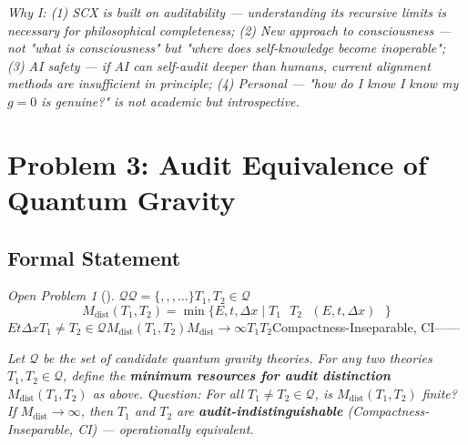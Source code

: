 \documentclass[12pt,a4paper]{article}
\theoremstyle{remark}
\newtheorem{openproblem}[theorem]{Open Problem}
\begin{document}
\medskip
\noindent\textit{Why I: (1) SCX is built on auditability — understanding its recursive limits is necessary for philosophical completeness; (2) New approach to consciousness — not "what is consciousness" but "where does self-knowledge become inoperable"; (3) AI safety — if AI can self-audit deeper than humans, current alignment methods are insufficient in principle; (4) Personal — "how do I know I know my $g=0$ is genuine?" is not academic but introspective.}

\newpage


\section{}
\section*{Problem 3: Audit Equivalence of Quantum Gravity}

\subsection{ Formal Statement}

\begin{openproblem}[]
\label{prob:qg}
$\mathcal{Q}$$\mathcal{Q} = \{\text{}, \text{}, \text{}, \ldots\}$$T_1, T_2 \in \mathcal{Q}$\textbf{}
\begin{equation}
    M_{\text{dist}}(T_1, T_2) = \min\{E, t, \Delta x \mid T_1 \text{  } T_2 \text{  } (E, t, \Delta x) \text{ }\}
\end{equation}
$E$$t$$\Delta x$$T_1 \neq T_2 \in \mathcal{Q}$$M_{\text{dist}}(T_1, T_2)$$M_{\text{dist}} \to \infty$$T_1$$T_2$\textbf{}Compactness-Inseparable, CI——
\end{openproblem}

\medskip
\noindent\textit{Let $\mathcal{Q}$ be the set of candidate quantum gravity theories. For any two theories $T_1, T_2 \in \mathcal{Q}$, define the \textbf{minimum resources for audit distinction} $M_{\text{dist}}(T_1, T_2)$ as above. Question: For all $T_1 \neq T_2 \in \mathcal{Q}$, is $M_{\text{dist}}(T_1, T_2)$ finite? If $M_{\text{dist}} \to \infty$, then $T_1$ and $T_2$ are \textbf{audit-indistinguishable} (Compactness-Inseparable, CI) — operationally equivalent.}
\end{document}
